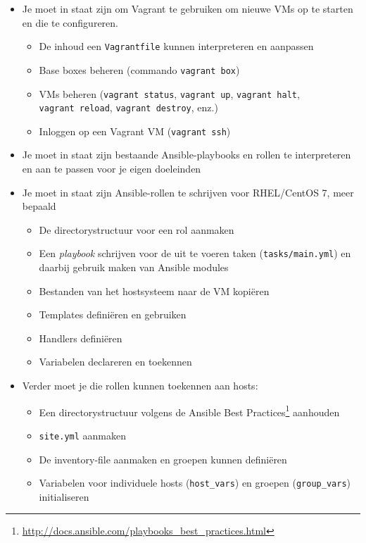 \begin{itemize}
  \item Je moet in staat zijn om Vagrant te gebruiken om nieuwe VMs op te starten en die te configureren.
  
  \begin{itemize}
    \item De inhoud een \texttt{Vagrantfile} kunnen interpreteren en aanpassen
    \item Base boxes beheren (commando \texttt{vagrant\ box})
    \item VMs beheren (\texttt{vagrant\ status}, \texttt{vagrant\ up}, \texttt{vagrant\ halt}, \texttt{vagrant\ reload}, \texttt{vagrant\ destroy}, enz.)
    \item Inloggen op een Vagrant VM (\texttt{vagrant\ ssh})
  \end{itemize}

  \item Je moet in staat zijn bestaande Ansible-playbooks en rollen te interpreteren en aan te passen voor je eigen doeleinden
  \item Je moet in staat zijn Ansible-rollen te schrijven voor RHEL/CentOS 7, meer bepaald
  
  \begin{itemize}
    \item De directorystructuur voor een rol aanmaken
    \item Een \emph{playbook} schrijven voor de uit te voeren taken (\texttt{tasks/main.yml}) en daarbij gebruik maken van Ansible modules
    \item Bestanden van het hostsysteem naar de VM kopiëren
    \item Templates definiëren en gebruiken
    \item Handlers definiëren
    \item Variabelen declareren en toekennen
  \end{itemize}
  
  \item Verder moet je die rollen kunnen toekennen aan hosts:
  
  \begin{itemize}
    \item Een directorystructuur volgens de Ansible Best Practices\footnote{\url{http://docs.ansible.com/playbooks_best_practices.html}} aanhouden
    \item \texttt{site.yml} aanmaken
    \item De inventory-file aanmaken en groepen kunnen definiëren
    \item Variabelen voor individuele hosts (\texttt{host\_vars}) en groepen (\texttt{group\_vars}) initialiseren
  \end{itemize}
\end{itemize}

